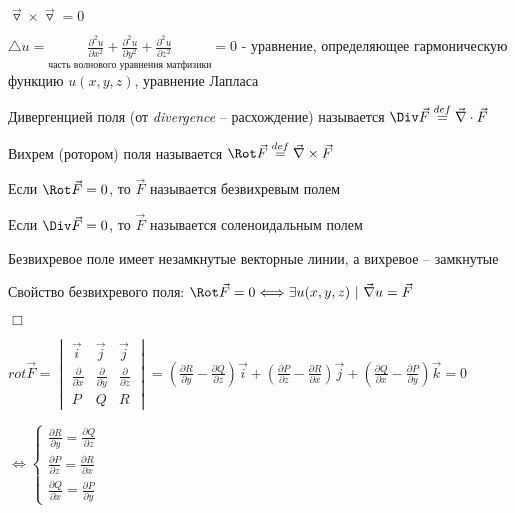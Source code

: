 \documentclass[12pt]{article}
\begin{document}
    $\overrightarrow{\triangledown} \times \overrightarrow{\triangledown} = 0$

    \Nota $\triangle u = \underset{\text{часть волнового уравнения матфизики}}{\frac{\partial^2 u}{\partial x^2} + \frac{\partial^2 u}{\partial y^2} + \frac{\partial^2 u}{\partial z^2}} = 0$ - уравнение, определяющее гармоническую функцию $u(x, y, z)$, уравнение Лапласа

    \hypertarget{divergence}{}

     Дивергенцией поля (от \textit{divergence} -- расхождение) называется
    $\Div \vec{F} \stackrel{def}{=} \vec\nabla \cdot \vec{F}$

    \hypertarget{rotor}{}

     Вихрем (ротором) поля называется $\Rot \vec{F} \stackrel{def}{=} \vec\nabla \times \vec{F}$

    \hypertarget{vectorfieldtypes}{}

     Если $\Rot \vec{F} = 0$, то $\vec{F}$ называется безвихревым полем

     Если $\Div \vec{F} = 0$, то $\vec{F}$ называется соленоидальным полем

    \Notas Безвихревое поле имеет незамкнутые векторные линии, а вихревое -- замкнутые

    \hypertarget{irrotationalfieldproperty}{}

    \begin{MyTheorem}
         Свойство безвихревого поля: $\Rot \vec{F} = 0 \Longleftrightarrow \exists u(x, y, z) \ | \ \vec\nabla u = \vec{F}$
    \end{MyTheorem}


    $\Box$ \fbox{\Longrightarrow}

    $rot \overrightarrow{F} =
    \begin{vmatrix}
        \overrightarrow{i}          & \overrightarrow{j}          & \overrightarrow{j}          \\
        \frac{\partial}{\partial x} & \frac{\partial}{\partial y} & \frac{\partial}{\partial z} \\
        P & Q & R
    \end{vmatrix} = \left(\frac{\partial R}{\partial y} - \frac{\partial Q}{\partial z}\right)\overrightarrow{i} + \left(\frac{\partial P}{\partial z} - \frac{\partial R}{\partial x}\right)\overrightarrow{j} + \left(\frac{\partial Q}{\partial x} - \frac{\partial P}{\partial y}\right)\overrightarrow{k} = 0$

    $\Longleftrightarrow
    \begin{cases}
        \frac{\partial R}{\partial y} = \frac{\partial Q}{\partial z} \\
        \frac{\partial P}{\partial z} = \frac{\partial R}{\partial x} \\
        \frac{\partial Q}{\partial x} = \frac{\partial P}{\partial y}
    \end{cases}$
\end{document}
